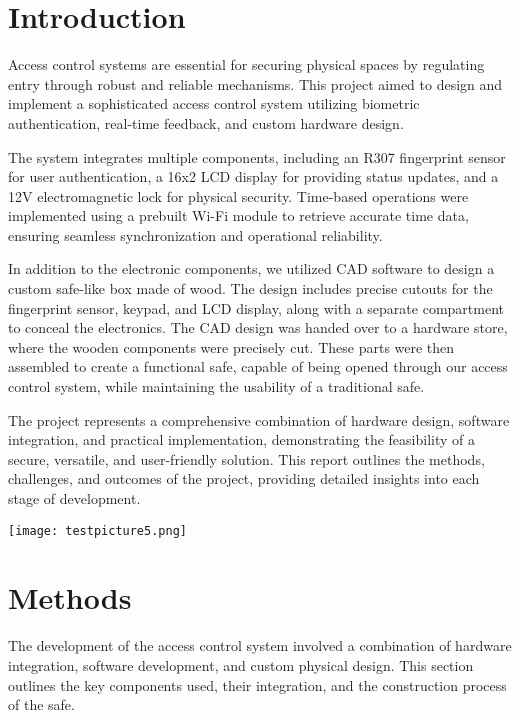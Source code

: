 \documentclass{article}
\begin{document}
\newpage 



\newpage
\section{Introduction}
Access control systems are essential for securing physical spaces by regulating entry through robust and reliable mechanisms. This project aimed to design and implement a sophisticated access control system utilizing biometric authentication, real-time feedback, and custom hardware design.

The system integrates multiple components, including an R307 fingerprint sensor for user authentication, a 16x2 LCD display for providing status updates, and a 12V electromagnetic lock for physical security. Time-based operations were implemented using a prebuilt Wi-Fi module to retrieve accurate time data, ensuring seamless synchronization and operational reliability.

In addition to the electronic components, we utilized CAD software to design a custom safe-like box made of wood. The design includes precise cutouts for the fingerprint sensor, keypad, and LCD display, along with a separate compartment to conceal the electronics. The CAD design was handed over to a hardware store, where the wooden components were precisely cut. These parts were then assembled to create a functional safe, capable of being opened through our access control system, while maintaining the usability of a traditional safe.

The project represents a comprehensive combination of hardware design, software integration, and practical implementation, demonstrating the feasibility of a secure, versatile, and user-friendly solution. This report outlines the methods, challenges, and outcomes of the project, providing detailed insights into each stage of development.



    \begin{center}
         \texttt{[image: testpicture5.png]} 
         \\[1cm] 
    \end{center}
    
\newpage
\section{Methods}
The development of the access control system involved a combination of hardware integration, software development, and custom physical design. This section outlines the key components used, their integration, and the construction process of the safe.
\end{document}
